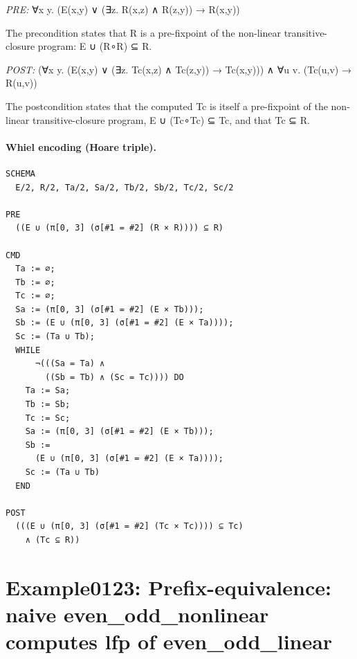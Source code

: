 \documentclass[10pt]{article}
\begin{document}
\textit{PRE:} ∀x y. (E(x,y) ∨ (∃z. R(x,z) ∧ R(z,y)) → R(x,y))\par The precondition states that R is a pre-fixpoint of the non-linear transitive-closure program: E ∪ (R∘R) ⊆ R.

\textit{POST:} (∀x y. (E(x,y) ∨ (∃z. Tc(x,z) ∧ Tc(z,y)) → Tc(x,y))) ∧ ∀u v. (Tc(u,v) → R(u,v))\par The postcondition states that the computed Tc is itself a pre-fixpoint of the non-linear transitive-closure program, E ∪ (Tc∘Tc) ⊆ Tc, and that Tc ⊆ R.

\paragraph{Whiel encoding (Hoare triple).}

\begin{Verbatim}[fontsize=\scriptsize,breaklines=true,breakanywhere=true,frame=single,framesep=1.5mm]
SCHEMA
  E/2, R/2, Ta/2, Sa/2, Tb/2, Sb/2, Tc/2, Sc/2

PRE
  ((E ∪ (π[0, 3] (σ[#1 = #2] (R × R)))) ⊆ R)

CMD
  Ta := ∅;
  Tb := ∅;
  Tc := ∅;
  Sa := (π[0, 3] (σ[#1 = #2] (E × Tb)));
  Sb := (E ∪ (π[0, 3] (σ[#1 = #2] (E × Ta))));
  Sc := (Ta ∪ Tb);
  WHILE
      ¬(((Sa = Ta) ∧
        ((Sb = Tb) ∧ (Sc = Tc)))) DO
    Ta := Sa;
    Tb := Sb;
    Tc := Sc;
    Sa := (π[0, 3] (σ[#1 = #2] (E × Tb)));
    Sb :=
      (E ∪ (π[0, 3] (σ[#1 = #2] (E × Ta))));
    Sc := (Ta ∪ Tb)
  END

POST
  (((E ∪ (π[0, 3] (σ[#1 = #2] (Tc × Tc)))) ⊆ Tc)
    ∧ (Tc ⊆ R))
\end{Verbatim}

\Needspace{0.45\textheight}

\section{Example0123: Prefix-equivalence: naive even\_odd\_nonlinear computes lfp of even\_odd\_linear}\label{case:Example0123}
\end{document}
